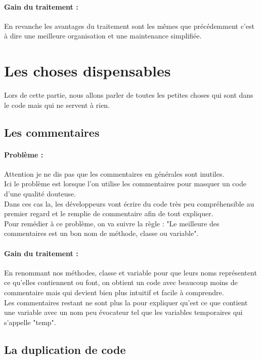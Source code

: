 \documentclass[a4paper,twoside,12pt,openright]{report}
\begin{document}
\paragraph{Gain du traitement :}
En revanche les avantages du traitement sont les mêmes que précédemment c'est à dire une meilleure organisation et une maintenance simplifiée.\\


\section{Les choses dispensables}
Lors de cette partie, nous allons parler de toutes les petites choses qui sont dans le code mais qui ne servent à rien.

\subsection{Les commentaires}
\paragraph{Problème :}
Attention je ne dis pas que les commentaires en générales sont inutiles.\\
Ici le problème est lorsque l'on utilise les commentaires pour masquer un code d'une qualité douteuse.\\
Dans ces cas la, les développeurs vont écrire du code très peu compréhensible au premier regard et le remplie de commentaire afin de tout expliquer.\\
Pour remédier à ce problème, on va suivre la règle : "Le meilleure des commentaires est un bon nom de méthode, classe ou variable".\\

\paragraph{Gain du traitement :}
En renommant nos méthodes, classe et variable pour que leurs noms représentent ce qu'elles contiennent ou font, on obtient un code avec beaucoup moins de commentaire mais qui devient bien plus intuitif et facile à comprendre.\\
Les commentaires restant ne sont plus la pour expliquer qu'est ce que contient une variable avec un nom peu évocateur tel que les variables temporaires qui s'appelle "temp".\\

\subsection{La duplication de code}
\end{document}
